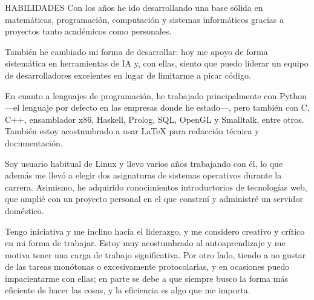 \documentclass{resume} %
\begin{document}
\begin{rSection}{HABILIDADES}
  Con los años he ido desarrollando una base sólida en matemáticas,
  programación, computación y sistemas informáticos gracias a proyectos
  tanto académicos como personales.

  También he cambiado mi forma de desarrollar: hoy me apoyo de forma
  sistemática en herramientas de IA y, con ellas, siento que puedo
  liderar un equipo de desarrolladores excelentes en lugar de limitarme
  a picar código.

  En cuanto a lenguajes de programación, he trabajado principalmente con
  Python ---el lenguaje por defecto en las empresas donde he
  estado---, pero también con C, C++, ensamblador x86, Haskell, Prolog,
  SQL, OpenGL y Smalltalk, entre otros. También estoy acostumbrado a usar
  \LaTeX{} para redacción técnica y documentación.

  Soy usuario habitual de Linux y llevo varios años trabajando con él,
  lo que además me llevó a elegir dos asignaturas de sistemas operativos
  durante la carrera. Asimismo, he adquirido conocimientos
  introductorios de tecnologías web, que amplié con un proyecto personal
  en el que construí y administré un servidor doméstico.


  Tengo iniciativa y me inclino hacia el liderazgo, y me considero
  creativo y crítico en mi forma de trabajar. Estoy muy
  acostumbrado al autoaprendizaje y me motiva tener una carga de trabajo
  significativa. Por otro lado, tiendo a no gustar de las tareas
  monótonas o excesivamente protocolarias, y en ocasiones puedo
  impacientarme con ellas; en parte se debe a que siempre busco la forma
  más eficiente de hacer las cosas, y la eficiencia es algo que me
  importa.
\end{rSection}
\end{document}
